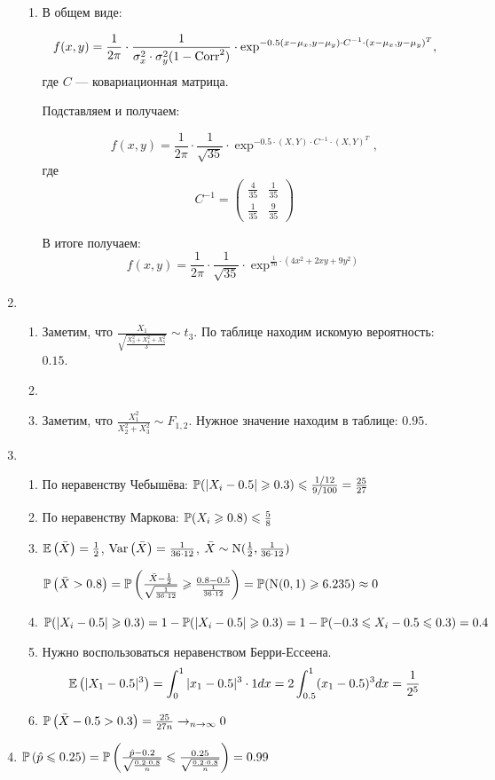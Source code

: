 \begin{enumerate}
\begin{enumerate}
\item В общем виде:

\[
	f(x,y) = \frac{1}{2\pi}\cdot\frac{1}{\sigma^{2}_{x}\cdot\sigma^{2}_{y}(1-\Corr^{2})}
	  \cdot 
	\exp^{-0.5(x-\mu_{x}, y - \mu_{y})\cdot C^{-1}\cdot (x-\mu_{x}, y - \mu_{y})^{T}}, 
\]
где $C$ — ковариационная матрица.

Подставляем и получаем:

\[
	f(x,y) = \frac{1}{2\pi}\cdot \frac{1}{\sqrt{35}}
	    \cdot 
	\exp^{-0.5\cdot (X,Y)\cdot C^{-1} \cdot (X,Y)^{T}}, 
\]
где 
\[
C^{-1} =
\begin{pmatrix}
  \frac{4}{35} & \frac{1}{35}\\
  \frac{1}{35} & \frac{9}{35}
\end{pmatrix}
\]

В итоге получаем:
\[
	f(x,y) = \frac{1}{2\pi}\cdot \frac{1}{\sqrt{35}}\cdot 
	\exp^{\frac{1}{70}\cdot(4x^{2}+2xy+9y^{2})}
\]
\end{enumerate}
\item
\begin{enumerate}
\item Заметим, что $\frac{X_1}{\sqrt{\frac{X_3^2+X_4^2+X_5^2}{3}}} \sim t_3$.
По таблице находим искомую вероятность: $0.15$.
\item
\item Заметим, что $\frac{X_1^2}{X_2^2+X_3^2} \sim F_{1, 2}$.
Нужное значение находим в таблице: $0.95$.
\end{enumerate}
\item
\begin{enumerate}
\item По неравенству Чебышёва:
$\P(|X_i-0.5|\geqslant 0.3) \leqslant \frac{1/12}{9/100} = \frac{25}{27}$
\item По неравенству Маркова: $\P(X_i \geqslant 0.8) \leqslant \frac{5}{8}$
\item $\E\left(\bar{X}\right) = \frac{1}{2}$,
$\Var\left(\bar{X}\right) = \frac{1}{36\cdot 12}$, $\bar{X}\sim\cN(\frac{1}{2}, \frac{1}{36\cdot12})$

$\P\left(\bar{X} > 0.8\right) = \P\left(\frac{\bar{X} - \frac{1}{2}}{\sqrt{ \frac{1}{36\cdot 12}}} \geq \frac{0.8-0.5}{ \frac{1}{36\cdot 12}} \right) = \P(\cN(0,1) \geq 6.235) \approx 0$
\item $ \P(|X_i-0.5|\geqslant 0.3) = 1 - \P(|X_i-0.5|\geqslant 0.3) = 1 - \P(-0.3 \leqslant X_i - 0.5 \leqslant 0.3) = 0.4$
\item Нужно воспользоваться неравенством Берри-Ессеена.
\[
\E\left(|X_1 - 0.5|^3\right) = \int_0^1 |x_1 -0.5|^3 \cdot 1 dx = 2 \int_{0.5}^1 (x_1 - 0.5)^3 dx = \frac{1}{2^5}
\]
\item $\P\left(\bar{X} - 0.5 > 0.3\right) = \frac{25}{27n} \to_{n \to \infty} 0$
\end{enumerate}
\item $\P\left(\hat{p} \leq 0.25\right) = \P\left(\frac{\hat{p} - 0.2}{\sqrt{\frac{0.2\cdot0.8}{n}}} \leq \frac{0.25}{\sqrt{\frac{0.2\cdot0.8}{n}}}\right) = 0.99$


\end{enumerate}
